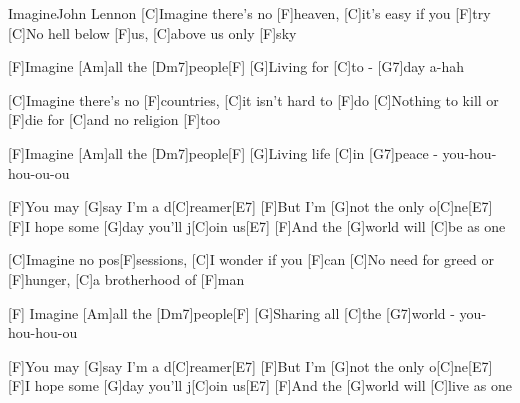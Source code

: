 \documentclass[../main.tex]{subfiles}
\begin{document}
\begin{song}{Imagine}{John Lennon}{}
[C]Imagine there's no [F]heaven, [C]it's easy if you [F]try
[C]No hell below [F]us, [C]above us only [F]sky

[F]Imagine [Am]all the [Dm7]people[F]{\hh}
[G]Living for [C]to - [G7]day a-hah

[C]Imagine there's no [F]countries, [C]it isn't hard to [F]do
[C]Nothing to kill or [F]die for [C]and no religion [F]too

[F]Imagine [Am]all the [Dm7]people[F]{\hh}
[G]Living life [C]in  [G7]peace - you-hou-hou-ou-ou

[F]You may [G]say I'm a d[C]reamer[E7]{\hh}
[F]But I'm [G]not the only o[C]ne[E7]{\hh}
[F]I hope some [G]day you'll j[C]oin us[E7]{\hh}
[F]And the [G]world will [C]be as one

[C]Imagine no pos[F]sessions, [C]I wonder if you [F]can
[C]No need for greed or [F]hunger, [C]a brotherhood of [F]man

[F] Imagine [Am]all the [Dm7]people[F]{\hh}
[G]Sharing all [C]the [G7]world - you-hou-hou-ou

[F]You may [G]say I'm a d[C]reamer[E7]{\hh}
[F]But I'm [G]not the only o[C]ne[E7]{\hh}
[F]I hope some [G]day you'll j[C]oin us[E7]{\hh}
[F]And the [G]world will [C]live as one
\end{song}
\end{document}
